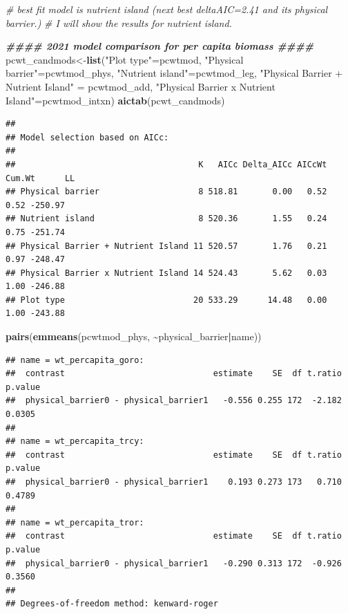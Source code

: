 \documentclass[
]{article}
\newenvironment{Shaded}{\begin{snugshade}}{\end{snugshade}}
\newcommand{\CommentTok}[1]{\textcolor[rgb]{0.56,0.35,0.01}{\textit{#1}}}
\newcommand{\DocumentationTok}[1]{\textcolor[rgb]{0.56,0.35,0.01}{\textbf{\textit{#1}}}}
\newcommand{\FunctionTok}[1]{\textcolor[rgb]{0.13,0.29,0.53}{\textbf{#1}}}
\newcommand{\NormalTok}[1]{#1}
\newcommand{\OtherTok}[1]{\textcolor[rgb]{0.56,0.35,0.01}{#1}}
\newcommand{\SpecialCharTok}[1]{\textcolor[rgb]{0.81,0.36,0.00}{\textbf{#1}}}
\newcommand{\StringTok}[1]{\textcolor[rgb]{0.31,0.60,0.02}{#1}}
\begin{document}
\begin{Shaded}
\begin{Highlighting}[]
\CommentTok{\# best fit model is nutrient island (next best deltaAIC=2.41 and it\textquotesingle{}s physical barrier.)}
\CommentTok{\# I will show the results for nutrient island. }


\DocumentationTok{\#\#\#\# 2021 model comparison for per capita biomass \#\#\#\# }
\NormalTok{pcwt\_candmods}\OtherTok{\textless{}{-}}\FunctionTok{list}\NormalTok{(}\StringTok{"Plot type"}\OtherTok{=}\NormalTok{pcwtmod, }
                    \StringTok{"Physical barrier"}\OtherTok{=}\NormalTok{pcwtmod\_phys,}
                    \StringTok{"Nutrient island"}\OtherTok{=}\NormalTok{pcwtmod\_leg,}
                    \StringTok{"Physical Barrier + Nutrient Island"} \OtherTok{=}\NormalTok{ pcwtmod\_add,}
                    \StringTok{"Physical Barrier x Nutrient Island"}\OtherTok{=}\NormalTok{pcwtmod\_intxn)}
\FunctionTok{aictab}\NormalTok{(pcwt\_candmods) }
\end{Highlighting}
\end{Shaded}

\begin{verbatim}
## 
## Model selection based on AICc:
## 
##                                     K   AICc Delta_AICc AICcWt Cum.Wt      LL
## Physical barrier                    8 518.81       0.00   0.52   0.52 -250.97
## Nutrient island                     8 520.36       1.55   0.24   0.75 -251.74
## Physical Barrier + Nutrient Island 11 520.57       1.76   0.21   0.97 -248.47
## Physical Barrier x Nutrient Island 14 524.43       5.62   0.03   1.00 -246.88
## Plot type                          20 533.29      14.48   0.00   1.00 -243.88
\end{verbatim}

\begin{Shaded}
\begin{Highlighting}[]
\FunctionTok{pairs}\NormalTok{(}\FunctionTok{emmeans}\NormalTok{(pcwtmod\_phys, }\SpecialCharTok{\textasciitilde{}}\NormalTok{physical\_barrier}\SpecialCharTok{|}\NormalTok{name))}
\end{Highlighting}
\end{Shaded}

\begin{verbatim}
## name = wt_percapita_goro:
##  contrast                              estimate    SE  df t.ratio p.value
##  physical_barrier0 - physical_barrier1   -0.556 0.255 172  -2.182  0.0305
## 
## name = wt_percapita_trcy:
##  contrast                              estimate    SE  df t.ratio p.value
##  physical_barrier0 - physical_barrier1    0.193 0.273 173   0.710  0.4789
## 
## name = wt_percapita_tror:
##  contrast                              estimate    SE  df t.ratio p.value
##  physical_barrier0 - physical_barrier1   -0.290 0.313 172  -0.926  0.3560
## 
## Degrees-of-freedom method: kenward-roger
\end{verbatim}
\end{document}
